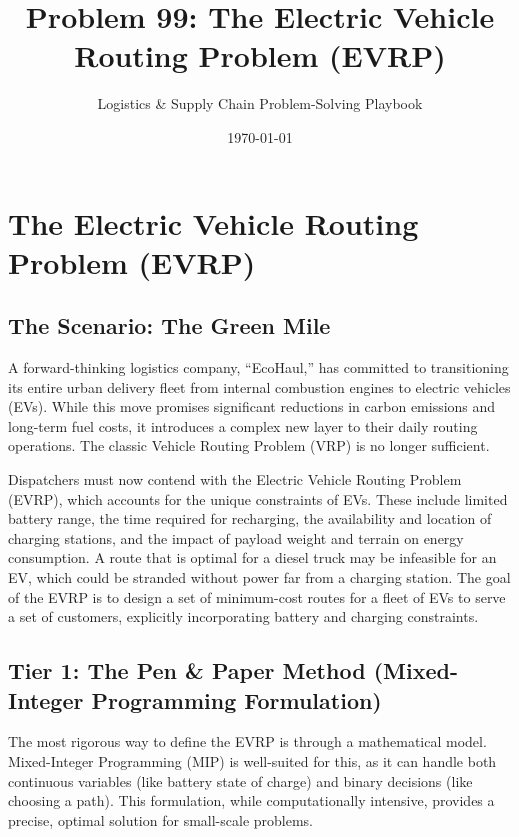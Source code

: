 \documentclass{article}
\title{Problem 99: The Electric Vehicle Routing Problem (EVRP)}
\author{Logistics \& Supply Chain Problem-Solving Playbook}
\date{\today}
\begin{document}
\maketitle
\tableofcontents
\newpage

\section{The Electric Vehicle Routing Problem (EVRP)}

\subsection{The Scenario: The Green Mile}
A forward-thinking logistics company, ``EcoHaul,'' has committed to transitioning its entire urban delivery fleet from internal combustion engines to electric vehicles (EVs). While this move promises significant reductions in carbon emissions and long-term fuel costs, it introduces a complex new layer to their daily routing operations. The classic Vehicle Routing Problem (VRP) is no longer sufficient.

Dispatchers must now contend with the Electric Vehicle Routing Problem (EVRP), which accounts for the unique constraints of EVs. These include limited battery range, the time required for recharging, the availability and location of charging stations, and the impact of payload weight and terrain on energy consumption. A route that is optimal for a diesel truck may be infeasible for an EV, which could be stranded without power far from a charging station. The goal of the EVRP is to design a set of minimum-cost routes for a fleet of EVs to serve a set of customers, explicitly incorporating battery and charging constraints.

\subsection{Tier 1: The Pen \& Paper Method (Mixed-Integer Programming Formulation)}
The most rigorous way to define the EVRP is through a mathematical model. Mixed-Integer Programming (MIP) is well-suited for this, as it can handle both continuous variables (like battery state of charge) and binary decisions (like choosing a path). This formulation, while computationally intensive, provides a precise, optimal solution for small-scale problems.
\end{document}
